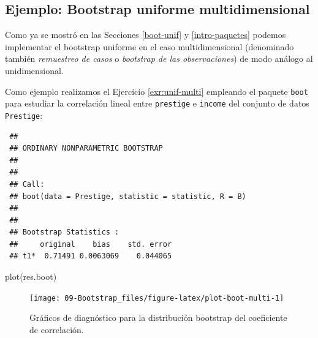 \documentclass[
  10pt,
]{book}
\newenvironment{Shaded}{\begin{snugshade}}{\end{snugshade}}
\newcommand{\AttributeTok}[1]{\textcolor[rgb]{0.77,0.63,0.00}{#1}}
\newcommand{\ControlFlowTok}[1]{\textcolor[rgb]{0.13,0.29,0.53}{\textbf{#1}}}
\newcommand{\DecValTok}[1]{\textcolor[rgb]{0.00,0.00,0.81}{#1}}
\newcommand{\FunctionTok}[1]{\textcolor[rgb]{0.00,0.00,0.00}{#1}}
\newcommand{\NormalTok}[1]{#1}
\newcommand{\OtherTok}[1]{\textcolor[rgb]{0.56,0.35,0.01}{#1}}
\newcommand{\SpecialCharTok}[1]{\textcolor[rgb]{0.00,0.00,0.00}{#1}}
\theoremstyle{break}
\theoremstyle{nonumberplain}
\begin{document}
\hypertarget{boot-unif-multi}{%
\subsection{Ejemplo: Bootstrap uniforme multidimensional}\label{boot-unif-multi}}

Como ya se mostró en las Secciones \ref{boot-unif} y \ref{intro-paquetes} podemos implementar el bootstrap uniforme en el caso multidimensional (denominado también \emph{remuestreo de casos} o \emph{bootstrap de las observaciones}) de modo análogo al unidimensional.

Como ejemplo realizamos el Ejercicio \ref{exr:unif-multi} empleando el paquete \texttt{boot} para estudiar la correlación lineal entre \texttt{prestige} e \texttt{income} del conjunto de datos \texttt{Prestige}:

\begin{Shaded}
\end{Shaded}

\begin{verbatim}
 ## 
 ## ORDINARY NONPARAMETRIC BOOTSTRAP
 ## 
 ## 
 ## Call:
 ## boot(data = Prestige, statistic = statistic, R = B)
 ## 
 ## 
 ## Bootstrap Statistics :
 ##     original    bias    std. error
 ## t1*  0.71491 0.0063069    0.044065
\end{verbatim}

\begin{Shaded}
\begin{Highlighting}[]
\FunctionTok{plot}\NormalTok{(res.boot)}
\end{Highlighting}
\end{Shaded}

\begin{figure}[!htbp]

{\centering \texttt{[image: 09-Bootstrap\_files/figure-latex/plot-boot-multi-1]} 

}

\caption{Gráficos de diagnóstico para la distribución bootstrap del coeficiente de correlación.}\label{fig:plot-boot-multi}
\end{figure}
\end{document}
